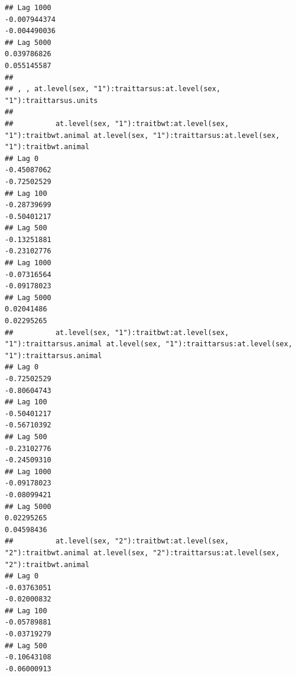 \documentclass[
  12pt,
]{book}
\begin{document}
\begin{verbatim}
## Lag 1000                                                     -0.007944374                                                        -0.004490036
## Lag 5000                                                      0.039786826                                                         0.055145587
## 
## , , at.level(sex, "1"):traittarsus:at.level(sex, "1"):traittarsus.units
## 
##          at.level(sex, "1"):traitbwt:at.level(sex, "1"):traitbwt.animal at.level(sex, "1"):traittarsus:at.level(sex, "1"):traitbwt.animal
## Lag 0                                                       -0.45087062                                                       -0.72502529
## Lag 100                                                     -0.28739699                                                       -0.50401217
## Lag 500                                                     -0.13251881                                                       -0.23102776
## Lag 1000                                                    -0.07316564                                                       -0.09178023
## Lag 5000                                                     0.02041486                                                        0.02295265
##          at.level(sex, "1"):traitbwt:at.level(sex, "1"):traittarsus.animal at.level(sex, "1"):traittarsus:at.level(sex, "1"):traittarsus.animal
## Lag 0                                                          -0.72502529                                                          -0.80604743
## Lag 100                                                        -0.50401217                                                          -0.56710392
## Lag 500                                                        -0.23102776                                                          -0.24509310
## Lag 1000                                                       -0.09178023                                                          -0.08099421
## Lag 5000                                                        0.02295265                                                           0.04598436
##          at.level(sex, "2"):traitbwt:at.level(sex, "2"):traitbwt.animal at.level(sex, "2"):traittarsus:at.level(sex, "2"):traitbwt.animal
## Lag 0                                                       -0.03763051                                                       -0.02000832
## Lag 100                                                     -0.05789881                                                       -0.03719279
## Lag 500                                                     -0.10643108                                                       -0.06000913

\end{verbatim}
\end{document}
